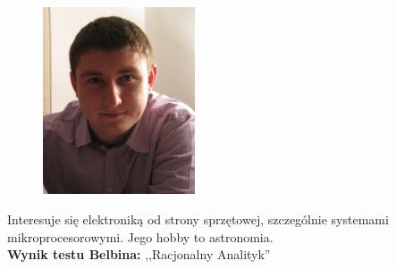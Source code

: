 \begin{figure}[H]
	\centering
	\includegraphics[width=0.4\textwidth]{img/pawel.jpg}
\end{figure}
Interesuje się elektroniką od strony sprzętowej, szczególnie systemami mikroprocesorowymi. Jego hobby to astronomia.\\
\textbf{Wynik testu Belbina: },,Racjonalny Analityk''
